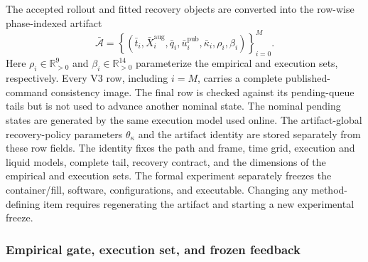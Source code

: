 The accepted rollout and fitted recovery objects are converted into the
row-wise phase-indexed artifact
\begin{equation}
  \bar{\mathcal A}=\left\{
  (\bar t_i,\bar X_i^{\mathrm{aug}},\bar q_i,
   \bar u_i^{\mathrm{pub}},\bar\kappa_i,\rho_i,\beta_i)
  \right\}_{i=0}^{M}.
  \label{eq:offline_artifact}
\end{equation}
Here $\rho_i\in\mathbb R_{>0}^{9}$ and
$\beta_i\in\mathbb R_{>0}^{14}$ parameterize the empirical and execution sets,
respectively.  Every V3 row, including $i=M$, carries a complete
published-command consistency image.  The final row is checked against its
pending-queue tails but is not used to advance another nominal state.  The
nominal pending states are generated by the same execution model used online.
The artifact-global recovery-policy parameters $\theta_\kappa$ and the artifact
identity are stored separately from these row fields.  The identity fixes the
path and frame, time grid, execution and liquid models, complete tail, recovery
contract, and the dimensions of the empirical and execution sets.  The formal
experiment separately freezes the container/fill, software, configurations,
and executable.  Changing any method-defining item requires regenerating the
artifact and starting a new experimental freeze.

\subsubsection{Empirical gate, execution set, and frozen feedback}

